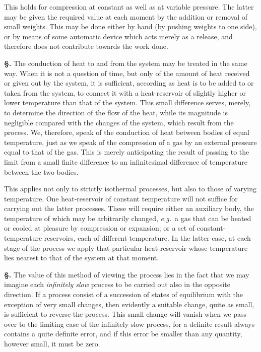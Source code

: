 \documentclass[12pt]{book}[2005/09/16]
\newcommand{\Section}[1]{
  \medskip\par\textbf{§\;#1}
  \label{section:#1}
}
\newcommand{\PageSep}[1]{\ignorespaces}
\newcommand{\eg}{\emph{e.g.}}
\begin{document}
This holds for compression at constant as well as at
variable pressure. The latter may be given the required
value at each moment by the addition or removal of small
weights. This may be done either by hand (by pushing
weights to one side), or by means of some automatic device
which acts merely as a release, and therefore does not contribute
towards the work done.

\Section{72.} The conduction of heat to and from the system may
be treated in the same way. When it is not a question of
time, but only of the amount of heat received or given out
by the system, it is sufficient, according as heat is to be
added to or taken from the system, to connect it with a heat-reservoir
of slightly higher or lower temperature than that
of the system. This small difference serves, merely, to
determine the direction of the flow of the heat, while its
magnitude is negligible compared with the changes of the
system, which result from the process. We, therefore, speak
of the conduction of heat between bodies of equal temperature,
just as we speak of the compression of a gas by an
external pressure equal to that of the gas. This is merely
anticipating the result of passing to the limit from a small
finite difference to an infinitesimal difference of temperature
between the two bodies.
\PageSep{51}
%
%

This applies not only to strictly isothermal processes,
but also to those of varying temperature. One heat-reservoir
of constant temperature will not suffice for carrying
out the latter processes. These will require either an
auxiliary body, the temperature of which may be arbitrarily
changed, \eg\ a gas that can be heated or cooled at pleasure
by compression or expansion; or a set of constant-temperature
reservoirs, each of different temperature. In the latter
case, at each stage of the process we apply that particular
heat-reservoir whose temperature lies nearest to that of the
system at that moment.

\Section{73.} The value of this method of viewing the process
lies in the fact that we may imagine each \emph{infinitely slow}
process to be carried out also in the opposite direction. If
a process consist of a succession of states of equilibrium
with the exception of very small changes, then evidently a
suitable change, quite as small, is sufficient to reverse the
process. This small change will vanish when we pass over
to the limiting case of the infinitely slow process, for a
%
definite result always contains a quite definite error, and if
this error be smaller than any quantity, however small, it
must be zero.
\end{document}
